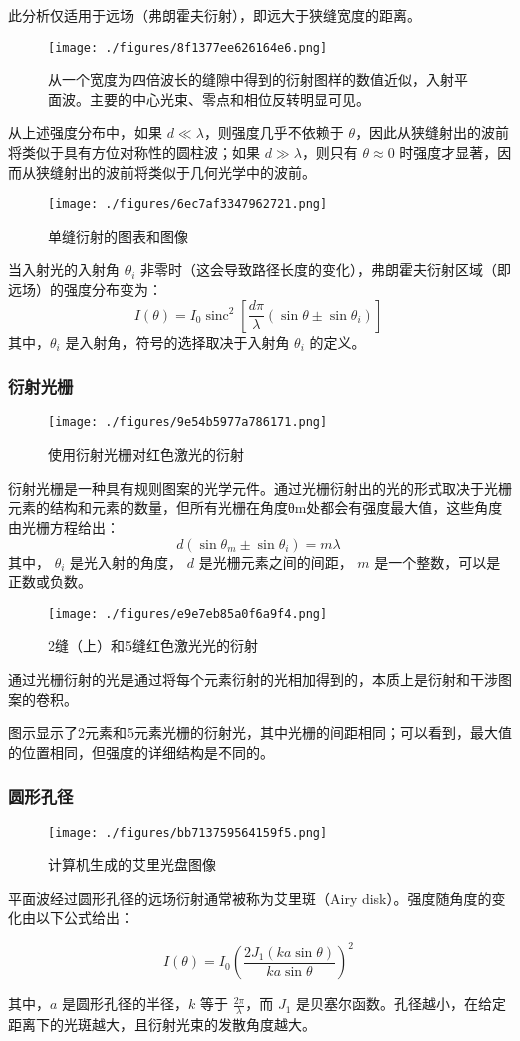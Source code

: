 此分析仅适用于远场（弗朗霍夫衍射），即远大于狭缝宽度的距离。
\begin{figure}[ht]
\centering
\texttt{[image: ./figures/8f1377ee626164e6.png]}
\caption{从一个宽度为四倍波长的缝隙中得到的衍射图样的数值近似，入射平面波。主要的中心光束、零点和相位反转明显可见。} \label{fig_YS_16}
\end{figure}
从上述强度分布中，如果 \( d \ll \lambda \)，则强度几乎不依赖于 \( \theta \)，因此从狭缝射出的波前将类似于具有方位对称性的圆柱波；如果 \( d \gg \lambda \)，则只有 \( \theta \approx 0 \) 时强度才显著，因而从狭缝射出的波前将类似于几何光学中的波前。
\begin{figure}[ht]
\centering
\texttt{[image: ./figures/6ec7af3347962721.png]}
\caption{单缝衍射的图表和图像} \label{fig_YS_17}
\end{figure}
当入射光的入射角 \( \theta_i \) 非零时（这会导致路径长度的变化），弗朗霍夫衍射区域（即远场）的强度分布变为：
\[
I(\theta) = I_0 \operatorname{sinc}^2 \left[ \frac{d\pi}{\lambda} (\sin \theta \pm \sin \theta_i) \right]~
\]
其中，\( \theta_i \) 是入射角，符号的选择取决于入射角 \( \theta_i \) 的定义。
\subsubsection{衍射光栅}  
\begin{figure}[ht]
\centering
\texttt{[image: ./figures/9e54b5977a786171.png]}
\caption{使用衍射光栅对红色激光的衍射} \label{fig_YS_18}
\end{figure} 
衍射光栅是一种具有规则图案的光学元件。通过光栅衍射出的光的形式取决于光栅元素的结构和元素的数量，但所有光栅在角度θm处都会有强度最大值，这些角度由光栅方程给出：  
\[
d\left(\sin {\theta _{m}}\pm \sin {\theta _{i}}\right)=m\lambda~
\]  
其中，  
\(\theta _{i}\) 是光入射的角度，  
\(d\) 是光栅元素之间的间距，  
\(m\) 是一个整数，可以是正数或负数。  
\begin{figure}[ht]
\centering
\texttt{[image: ./figures/e9e7eb85a0f6a9f4.png]}
\caption{2缝（上）和5缝红色激光光的衍射} \label{fig_YS_19}
\end{figure}
通过光栅衍射的光是通过将每个元素衍射的光相加得到的，本质上是衍射和干涉图案的卷积。  

图示显示了2元素和5元素光栅的衍射光，其中光栅的间距相同；可以看到，最大值的位置相同，但强度的详细结构是不同的。
\subsubsection{圆形孔径}
\begin{figure}[ht]
\centering
\texttt{[image: ./figures/bb713759564159f5.png]}
\caption{计算机生成的艾里光盘图像} \label{fig_YS_20}
\end{figure}
平面波经过圆形孔径的远场衍射通常被称为艾里斑（Airy disk）。强度随角度的变化由以下公式给出：

\[ I(\theta) = I_0 \left( \frac{2J_1(ka \sin \theta)}{ka \sin \theta} \right)^2~\]

其中，\( a \) 是圆形孔径的半径，\( k \) 等于 \( \frac{2\pi}{\lambda} \)，而 \( J_1 \) 是贝塞尔函数。孔径越小，在给定距离下的光斑越大，且衍射光束的发散角度越大。